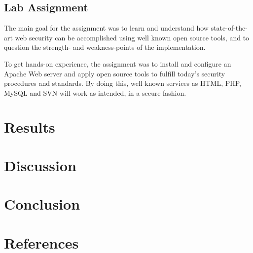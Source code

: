 \documentclass[a4paper, 12pt]{article}
\begin{document}
\subsection{Lab Assignment}
The main goal for the assignment was to learn and understand how state-of-the-art web security can be accomplished using well known open source tools, and to question the strength- and weakness-points of the implementation.

To get hands-on experience, the assignment was to install and configure an Apache Web server and apply open source tools to fulfill today’s security procedures and standards. By doing this, well known services as HTML, PHP, MySQL and SVN will work as intended, in a secure fashion.


\section{Results}

\section{Discussion}

\section{Conclusion}


\section{References}
\newpage
\renewcommand*{\bibname}{\vspace{-20pt}\section{References}\vspace{-20pt}}


\end{document}
